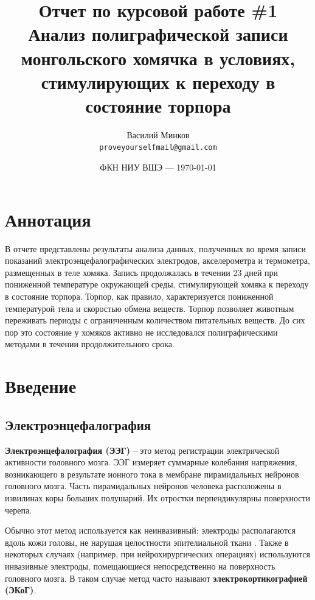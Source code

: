 \documentclass[12pt,a4paper,oneside]{article}
\title{Отчет по курсовой работе \#1 \\ Анализ полиграфической записи монгольского хомячка в условиях, стимулирующих к переходу в состояние торпора} %
\author{Василий Минков\\ \texttt{proveyourselfmail@gmail.com}} %
\date{ФКН НИУ ВШЭ --- \today} %
\begin{document}
\maketitle %


\tableofcontents

\section{Аннотация}

В отчете представлены результаты анализа данных, полученных во время записи показаний электроэнцефалографических электродов, акселерометра и термометра, размещенных в теле хомяка. Запись продолжалась в течении 23 дней при пониженной температуре окружающей среды, стимулирующей хомяка к переходу в состояние торпора. Торпор, как правило, характеризуется пониженной температурой тела и скоростью обмена веществ. Торпор позволяет животным переживать периоды с ограниченным количеством питательных веществ. До сих пор это состояние у хомяков активно не исследовался полиграфическими методами в течении продолжительного срока.

\section{Введение}

\subsection{Электроэнцефалография}

\textbf{Электроэнцефалография (ЭЭГ)} -- это метод регистрации электрической активности головного мозга. ЭЭГ измеряет суммарные колебания напряжения, возникающего в результате ионного тока в мембране пирамидальных нейронов головного мозга. Часть пирамидальных нейронов человека расположены в извилинах коры больших полушарий. Их отростки перпендикулярны поверхности черепа. 

Обычно этот метод используется как неинвазивный: электроды располагаются вдоль кожи головы, не нарушая целостности эпителиальной ткани \cite{Luck2005}. Также в некоторых случаях (например, при нейрохирургических операциях) используются инвазивные электроды, помещающиеся непосредственно на поверхность головного мозга. В таком случае метод часто называют \textbf{электрокортикографией (ЭКоГ)}. 
\end{document}
